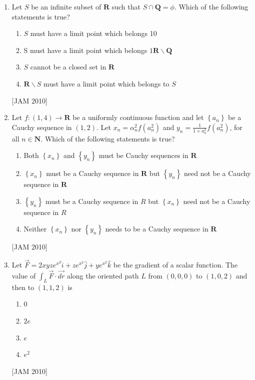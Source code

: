 \begin{enumerate}
\item  Let $S$ be an infinite subset of $\mathbf{R}$ such that $S \cap \mathbf{Q}=\phi$. Which of the following statements is true? 

\begin{enumerate}
    \item $S$ must have a limit point which belongs 10 
\item S must have a limit point which belongs $1 \mathbf{R} \backslash \mathbf{Q}$ 
\item $S$ cannot be a closed set in $\mathbf{R}$ 
\item $\mathbf{R} \backslash S$ must have a limit point which belongs to $S$
\end{enumerate}
\hfill [JAM 2010]





\item  Let $f:(1,4) \rightarrow \mathbf{R}$ be a uniformly continuous function and let $\left\{a_{n}\right\}$ be a Cauchy sequence in $(1,2)$. Let $x_{n}=\alpha_{n}^{2} f\left(a_{n}^{2}\right)$ and $y_{n}=\frac{1}{1+a_{n}^{2}} f\left(a_{n}^{2}\right)$, for all $n \in \mathbf{N}$. Which of the following statements is true? 

\begin{enumerate}
    
\item Both $\left\{x_{n}\right\}$ and $\left\{y_{n}\right\}$ must be Cauchy sequences in $\mathbf{R}$ 
\item $\left\{x_{n}\right\}$ must be a Cauchy sequence in $\mathbf{R}$ but $\left\{y_{n}\right\}$ need not be a Cauchy sequence in $\mathbf{R}$ 
\item $\left\{y_{n}\right\}$ must be a Cauchy sequence in $R$ but $\left\{x_{n}\right\}$ need not be a Cauchy sequence in $R$ 
\item Neither $\left\{x_{n}\right\}$ nor $\left\{y_{n}\right\}$ needs to be a Cauchy sequence in $\mathbf{R}$
\end{enumerate}
\hfill [JAM 2010]




\item  Let $\vec{F}=2 x y z e^{x^{2}} \hat{i}+z e^{x^{2}} \hat{j}+y e^{x^{2}} \hat{k}$ be the gradient of a scalar function. The value of $\int_{L} \vec{F} \cdot \overrightarrow{d r}$ along the oriented path $L$ from $(0,0,0)$ to $(1,0,2)$ and then to $(1,1,2)$ is 

\begin{enumerate} 
\item 0 
\item $2 e$ 
\item $e$ 
\item $e^{2}$
\end{enumerate}
\hfill [JAM 2010]





\end{enumerate}
